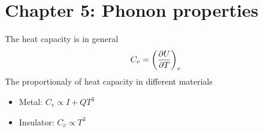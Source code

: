 \documentclass[../main.tex]{subfiles}
\begin{document}
\pagestyle{fancy}

\section*{Chapter 5: Phonon properties} 

The heat capacity is in general
\begin{align*}
    C_v = \qt(\pdv{U}{T})_v
\end{align*}
The proportionaly of heat capacity in different materials
\begin{itemize}
    \item Metal: $C_v \propto I + Q T^3$
    \item Insulator: $C_v \propto T^3$
\end{itemize}
\end{document}
